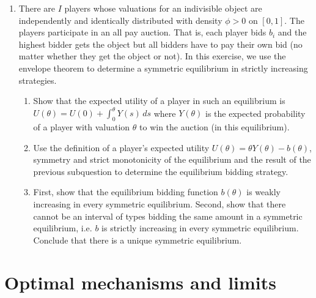 \documentclass[a4paper,12pt]{article}
\begin{document}
\begin{enumerate}
\item There are $I$ players whose valuations for an indivisible object are independently and identically distributed with density $\phi>0$ on $[0,1]$. The players participate in an all pay auction. That is, each player bids $b_i$ and the highest bidder gets the object but all bidders have to pay their own bid (no matter whether they get the object or not). In this exercise, we use the envelope theorem to determine a symmetric equilibrium in strictly increasing strategies.
  \begin{enumerate}
  \item Show that the expected utility of a player in such an equilibrium is $U(\theta)=U(0)+\int_0^\theta Y(s)\,ds$ where $Y(\theta)$ is the expected probability of a player with valuation $\theta$ to win the auction (in this equilibrium).
  \item Use the definition of a player's expected utility $U(\theta)=\theta Y(\theta )-b(\theta )$, symmetry and strict monotonicity of the equilibrium and the result of the previous subquestion to determine the equilibrium bidding strategy.
    \item First, show that the equilibrium bidding function $b(\theta )$ is weakly increasing in every symmetric equilibrium. Second, show that there cannot be an interval of types bidding the same amount in a symmetric equilibrium, i.e. $b$ is strictly increasing in every symmetric equilibrium. Conclude that there is a unique symmetric equilibrium.
    \end{enumerate}
\end{enumerate}

\section{Optimal mechanisms and limits}
\label{sec:optim-mech-limits}
\end{document}
